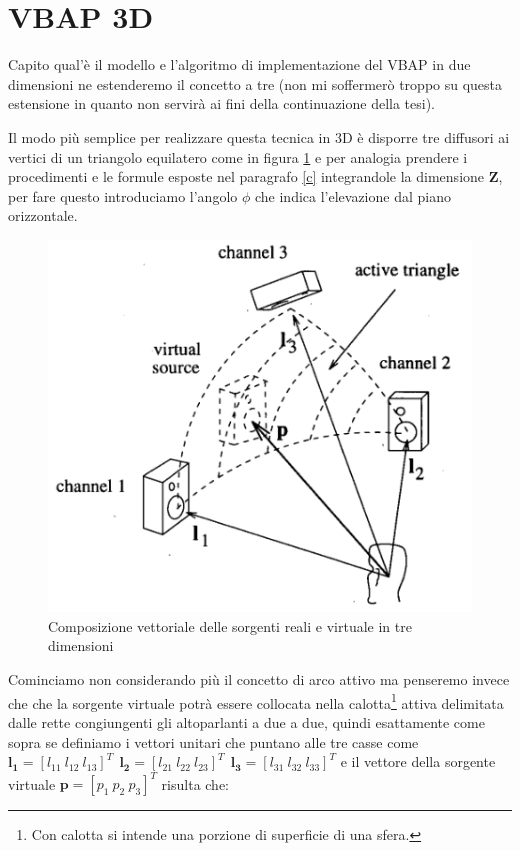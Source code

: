 \documentclass[12pt,a4paper]{report}
\begin{document}
\section{VBAP 3D}

Capito qual'è il modello e l'algoritmo di implementazione del VBAP in due dimensioni ne estenderemo il concetto a tre (non mi soffermerò troppo su questa estensione in quanto non servirà ai fini della continuazione della tesi).

Il modo più semplice per realizzare questa tecnica in 3D è disporre tre diffusori ai vertici di un triangolo equilatero come in figura \ref{fig:triangolo} e per analogia prendere i procedimenti e le formule esposte nel paragrafo \ref{c} integrandole la dimensione $\boldsymbol{Z}$, per fare questo introduciamo l'angolo $\phi$ che indica l'elevazione dal piano orizzontale.

\begin{figure}[htbp]
	\centering
	\includegraphics[scale=0.50]{figures/matrix3d.png}
	\caption {Composizione vettoriale delle sorgenti reali e virtuale in tre dimensioni}
	\label{fig:triangolo}
	\end{figure}

Cominciamo non considerando più il concetto di arco attivo ma penseremo invece che che la sorgente virtuale potrà essere collocata nella calotta\footnote{Con calotta si intende una porzione di superficie di una sfera.} attiva delimitata dalle rette congiungenti gli altoparlanti a due a due,	 quindi esattamente come sopra se definiamo i vettori unitari che puntano alle tre casse come $ \boldsymbol{l_{1}}= {\left[ l_{11} \ l_{12} \ l_{13} \right]}^T \ \ \boldsymbol{l_{2}}= {\left[ l_{21} \ l_{22} \ l_{23} \right]}^T \ \ \boldsymbol{l_{3}}= {\left[ l_{31} \ l_{32} \ l_{33} \right]}^T$ e il vettore della sorgente virtuale $\boldsymbol{p}= {\left[ p_{1} \ p_{2} \ p_{3} \right]}^T$ risulta che:
\end{document}

